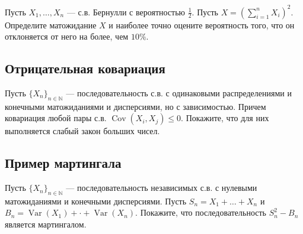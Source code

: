 \documentclass[12pt]{article}
\newcommand\N{\mathbb{N}}
\DeclareMathOperator{\Var}{Var}
\DeclareMathOperator{\Cov}{Cov}
\begin{document}
Пусть $X_1, \dots, X_n$ --- с.в. Бернулли с вероятностью $\frac{1}{2}$. Пусть $X = (\sum_{i = 1}^n X_i)^2$. Определите матожидание $X$ и наиболее точно оцените вероятность того, что он отклоняется от него на более, чем $10\%$.

\subsection{Отрицательная ковариация}

Пусть $\{X_n\}_{n \in \N}$ --- последовательность с.в. с одинаковыми распределениями и конечными матожиданиями и дисперсиями, но с зависимостью. Причем ковариация любой пары с.в. $\Cov(X_i, X_j) \le 0$. Покажите, что для них выполняется слабый закон больших чисел.


\subsection{Пример мартингала}

Пусть $\{X_n\}_{n \in \N}$ --- последовательность независимых с.в. с нулевыми матожиданиями и конечными дисперсиями. Пусть $S_n = X_1 + \dots + X_n$ и $B_n = \Var(X_1) + \cdot + \Var(X_n)$. Покажите, что последовательность $S_n^2 - B_n$ является мартингалом.
\end{document}
